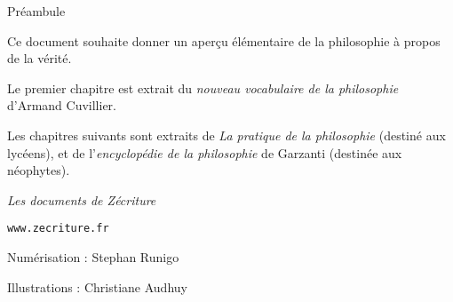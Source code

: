 
\thispagestyle{empty}

\begin{center}
\Large
Préambule
\normalsize
\end{center}
\vspace{1cm}

Ce document souhaite donner un aperçu élémentaire de la
philosophie à propos de la vérité.


Le premier chapitre est extrait du {\it nouveau vocabulaire de la philosophie} d'Armand Cuvillier.

Les chapitres suivants sont extraits de {\it La pratique de la philosophie} (destiné aux
lycéens), et de l'{\it encyclopédie de la philosophie} de Garzanti (destinée aux néophytes).

\vfill

\begin{center}
\hspace{1cm}
\end{center}


\vfill
\vspace{1.7cm}

\hfill {\it Les documents de Zécriture}

\hfill \texttt{www.zecriture.fr}

\vspace{0.7cm}


\hfill Numérisation : Stephan Runigo

\hfill Illustrations : Christiane Audhuy

